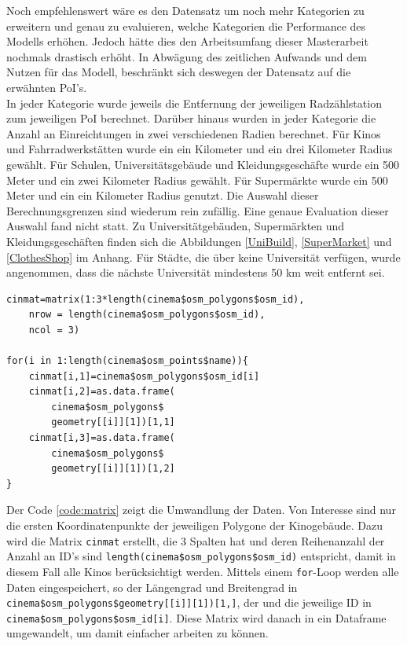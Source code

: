 \documentclass[a4paper,12pt]{thesis}
\begin{document}
Noch empfehlenswert wäre es den Datensatz um noch mehr Kategorien zu erweitern und genau zu evaluieren, welche Kategorien die Performance des Modells erhöhen. Jedoch hätte dies den Arbeitsumfang dieser Masterarbeit nochmals drastisch erhöht. In Abwägung des zeitlichen Aufwands und dem Nutzen für das Modell, beschränkt sich deswegen der Datensatz auf die erwähnten PoI's.\\
In jeder Kategorie wurde jeweils die Entfernung der jeweiligen Radzählstation zum jeweiligen PoI berechnet. Darüber hinaus wurden in jeder Kategorie die Anzahl an Einreichtungen in zwei verschiedenen Radien berechnet. Für Kinos und Fahrradwerkstätten wurde ein ein Kilometer und ein drei Kilometer Radius gewählt. Für Schulen, Universitätsgebäude und Kleidungsgeschäfte wurde ein 500 Meter und ein zwei Kilometer Radius gewählt. Für Supermärkte wurde ein 500 Meter und ein ein Kilometer Radius genutzt. Die Auswahl dieser Berechnungsgrenzen sind wiederum rein zufällig. Eine genaue Evaluation dieser Auswahl fand nicht statt. Zu Universitätgebäuden, Supermärkten und Kleidungsgeschäften finden sich die Abbildungen \ref{UniBuild}, \ref{SuperMarket} und \ref{ClothesShop} im Anhang. Für Städte, die über keine Universität verfügen, wurde angenommen, dass die nächste Universität mindestens 50 km weit entfernt sei.

\begin{lstlisting}[caption={Speichere die OSM Koordinaten},label=code:matrix]
cinmat=matrix(1:3*length(cinema$osm_polygons$osm_id), 
	nrow = length(cinema$osm_polygons$osm_id), 
	ncol = 3)
	
for(i in 1:length(cinema$osm_points$name)){
   	cinmat[i,1]=cinema$osm_polygons$osm_id[i]
	cinmat[i,2]=as.data.frame(
		cinema$osm_polygons$
		geometry[[i]][1])[1,1]
	cinmat[i,3]=as.data.frame(
		cinema$osm_polygons$
		geometry[[i]][1])[1,2]
}
\end{lstlisting}

Der Code \ref{code:matrix} zeigt die Umwandlung der Daten. Von Interesse sind nur die ersten Koordinatenpunkte der jeweiligen Polygone der Kinogebäude. Dazu wird die Matrix \lstinline|cinmat| erstellt, die 3 Spalten hat und deren Reihenanzahl der Anzahl an ID's sind \lstinline|length(cinema$osm_polygons$osm_id)| entspricht, damit in diesem Fall alle Kinos berücksichtigt werden. Mittels einem \lstinline|for|-Loop werden alle Daten eingespeichert, so der Längengrad und Breitengrad in \lstinline|cinema$osm_polygons$geometry[[i]][1])[1,]|, der  und die jeweilige ID in \lstinline|cinema$osm_polygons$osm_id[i]|. Diese Matrix wird danach in ein Dataframe umgewandelt, um damit einfacher arbeiten zu können.\\
\end{document}

